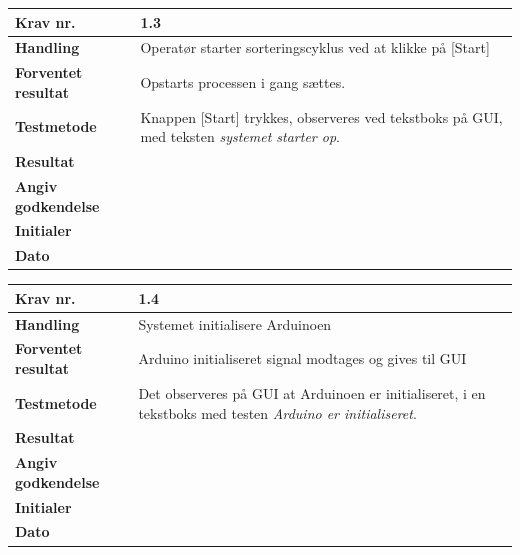 	
	\begin{center}
		\begin{longtable}{ | m{4cm}| m{8.5cm}|} 
			\hline
			\textbf{Krav nr.} & 1.3    \\ 
			\hline
			\textbf{Handling} &  Operatør starter sorteringscyklus ved at klikke på [Start]  \\
			\hline
			\textbf{Forventet resultat} &  Opstarts processen i gang sættes.  \\
			\hline
			\textbf{Testmetode}  & Knappen [Start] trykkes, observeres ved tekstboks på GUI, med teksten \textit{systemet starter op}.   \\
			\hline
			\textbf{Resultat}  &    \\
			\hline
			\textbf{Angiv godkendelse} &     \\
			\hline
			\textbf{Initialer} &     \\
			\hline
			\textbf{Dato} &    \\
			\hline
		\end{longtable}
	\end{center}
	
	\begin{center}
		\begin{longtable}{ | m{4cm}| m{8.5cm}|} 
			\hline
			\textbf{Krav nr.} & 1.4    \\ 
			\hline
			\textbf{Handling} &  Systemet initialisere Arduinoen   \\
			\hline
			\textbf{Forventet resultat} &  Arduino initialiseret signal modtages og gives til GUI  \\
			\hline
			\textbf{Testmetode}  & Det observeres på GUI at Arduinoen er initialiseret, i en tekstboks med testen \textit{Arduino er initialiseret}.   \\
			\hline
			\textbf{Resultat}  &    \\
			\hline
			\textbf{Angiv godkendelse} &     \\
			\hline
			\textbf{Initialer} &     \\
			\hline
			\textbf{Dato} &    \\
			\hline
		\end{longtable}
	\end{center}
	
